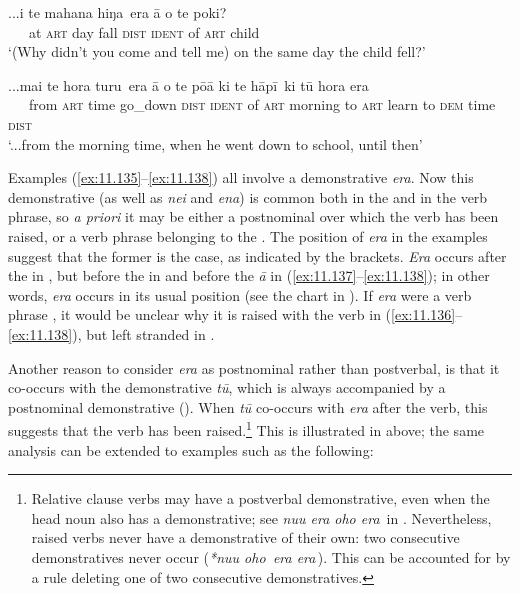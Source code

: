 \ea\label{ex:11.137}
\gll ...{\ꞌ}i te mahana {\ob}hiŋa\,{\cb} era {\ꞌ}ā o te poki? \\
~~~at \textsc{art} day {\db}fall \textsc{dist} \textsc{ident} of \textsc{art} child \\

\glt 
‘(Why didn’t you come and tell me) on the same day the child fell?’ \textstyleExampleref{[R313.106]} 
\z

\ea\label{ex:11.138}
\gll ...mai te hora {\ob}turu\,{\cb} era {\ꞌ}ā o te pō{\ꞌ}ā {\ob}ki te hāpī\,{\cb} ki tū hora era \\
~~~from \textsc{art} time {\db}go\_down \textsc{dist} \textsc{ident} of \textsc{art} morning {\db}to \textsc{art} learn to \textsc{dem} time \textsc{dist} \\

\glt
‘...from the morning time, when he went down to school, until then’ \textstyleExampleref{[R245.009]} 
\z

Examples (\ref{ex:11.135}–\ref{ex:11.138}) all involve a demonstrative \textit{era}. Now this demonstrative (as well as \textit{nei} and \textit{ena}) is common both in the  and in the verb phrase, so \textit{a priori} it may be either a postnominal  over which the verb has been raised, or a verb phrase  belonging to the . The position of \textit{era} in the examples suggest that the former is the case, as indicated by the brackets. \textit{Era} occurs after the  in , but before the  in  and before the  \textit{{\ꞌ}ā} in (\ref{ex:11.137}–\ref{ex:11.138}); in other words, \textit{era} occurs in its usual  position (see the chart in ). If \textit{era} were a verb phrase , it would be unclear why it is raised with the verb in (\ref{ex:11.136}–\ref{ex:11.138}), but left stranded in .

Another reason to consider \textit{era} as postnominal rather than postverbal, is that it co-occurs with the demonstrative \textit{tū}, which is always accompanied by a postnominal de\-mon\-strative (). When \textit{tū} co-occurs with \textit{era} after the verb, this suggests that the verb has been raised.\footnote{\label{fn:519}Relative clause verbs may have a postverbal demonstrative, even when the head noun also has a demonstrative; see \textit{nu{\ꞌ}u era {\ob}oho era\,{\cb}} in . Nevertheless, raised verbs never have a demonstrative of their own: two consecutive demonstratives never occur (\textit{*nu{\ꞌ}u {\ob}oho\,{\cb} era {\ob}era\,{\cb}}). This can be accounted for by a rule deleting one of two consecutive demonstratives.} This is illustrated in  above; the same analysis can be extended to examples such as the following:


